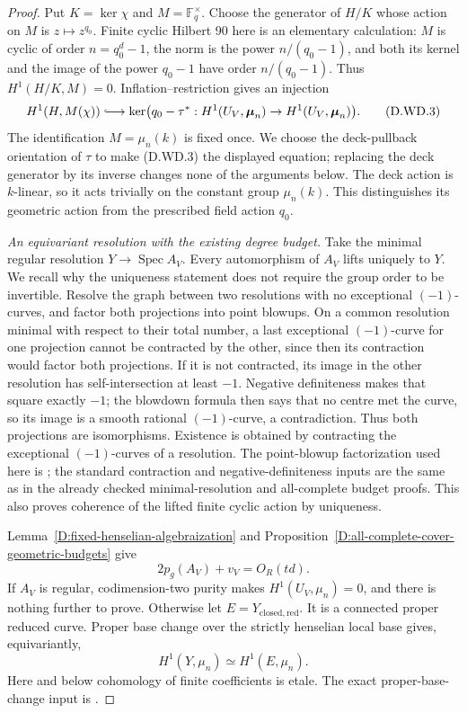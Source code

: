 \begin{proof}
Put $K=\ker\chi$ and $M=\mathbb F_q^\times$.
Choose the generator of $H/K$ whose action on $M$ is
$z\mapsto z^{q_0}$. Finite cyclic Hilbert 90 here is
an elementary calculation: $M$ is cyclic of order
$n=q_0^d-1$, the norm is the power
$n/(q_0-1)$, and both its kernel and the image of the
power $q_0-1$ have order $n/(q_0-1)$. Thus
$H^1(H/K,M)=0$. Inflation--restriction gives an injection
\[
 H^1(H,M(\chi))\lhook\joinrel\longrightarrow
     \ker\bigl(q_0-\tau^*:H^1(U_V,\boldsymbol\mu_n)
                              \to H^1(U_V,\boldsymbol\mu_n)\bigr).
                                                               \tag{D.WD.3}
\]
The identification $M=\mu_n(k)$ is fixed once. We choose
the deck-pullback orientation of $\tau$ to make (D.WD.3)
the displayed equation; replacing the deck generator by
its inverse changes none of the arguments below.
The deck action is $k$-linear, so it acts trivially on
the constant group $\mu_n(k)$. This distinguishes its
geometric action from the prescribed field action $q_0$.

\emph{An equivariant resolution with the existing degree budget.}
Take the minimal regular resolution $Y\to\operatorname{Spec}A_V$.
Every automorphism of $A_V$ lifts uniquely to $Y$.
We recall why the uniqueness statement does not require
the group order to be invertible. Resolve the graph between
two resolutions with no exceptional $(-1)$-curves, and
factor both projections into point blowups. On a common
resolution minimal with respect to their total number,
a last exceptional $(-1)$-curve for one projection cannot
be contracted by the other, since then its contraction
would factor both projections. If it is not contracted,
its image in the other resolution has self-intersection
at least $-1$. Negative definiteness makes that square
exactly $-1$; the blowdown formula then says that no centre
met the curve, so its image is a smooth rational
$(-1)$-curve, a contradiction. Thus both projections are
isomorphisms. Existence is obtained by contracting the
exceptional $(-1)$-curves of a resolution. The point-blowup
factorization used here is
\citet[Lemma 54.17.1, Tag 0C5R]{StacksHereditaryCartierD};
the standard contraction and negative-definiteness inputs
are the same as in the already checked minimal-resolution
and all-complete budget proofs. This also proves coherence
of the lifted finite cyclic action by uniqueness.

Lemma~\ref{D:fixed-henselian-algebraization} and
Proposition~\ref{D:all-complete-cover-geometric-budgets}
give
\[
                         2p_g(A_V)+v_V=O_R(td).          \tag{D.WD.4}
\]
If $A_V$ is regular, codimension-two purity makes
$H^1(U_V,\mu_n)=0$, and there is nothing further to prove.
Otherwise let $E=Y_{\mathrm{closed,red}}$. It is a connected
proper reduced curve. Proper base change over the strictly
henselian local base gives, equivariantly,
\[
                    H^1(Y,\mu_n)\simeq H^1(E,\mu_n).
                                                               \tag{D.WD.5}
\]
Here and below cohomology of finite coefficients is etale.
The exact proper-base-change input is
\citet[Theorem 59.91.11, Tag 095T]{StacksSemilinearDeterminantsB}.


\end{proof}
